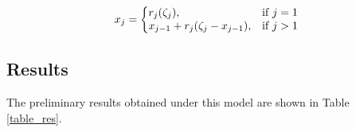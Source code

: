 \documentclass[12pt,letterpaper]{article}
\begin{document}
\begin{equation}
x_j = \left\{
\begin{array}{@{}ll@{}}
    r_j (\zeta_j), & \text{if}\ j = 1 \\
    x_{j - 1} + r_j (\zeta_j - x_{j - 1}), & \text{if}\ j > 1 \\
\end{array}\right.
\end{equation}



\clearpage
\subsection{Results}
The preliminary results obtained under this model are shown in Table \ref{table_res}. 


\renewcommand\baselinestretch{1.2}\selectfont
\end{document}
